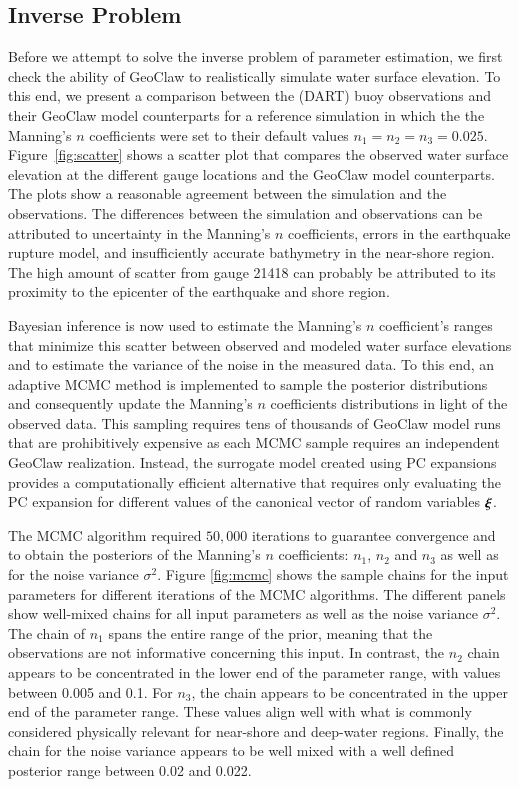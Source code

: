 \documentclass[review,12pt]{elsarticle}
\newcommand{\xxi}{\vec{\xi}}
\renewcommand{\vec}[1]{{\mathchoice
                     {\mbox{\boldmath$\displaystyle{#1}$}}
                     {\mbox{\boldmath$\textstyle{#1}$}}
                     {\mbox{\boldmath$\scriptstyle{#1}$}}
                     {\mbox{\boldmath$\scriptscriptstyle{#1}$}}}}
\newcommand{\geoclaw}{{\sc GeoClaw}\xspace}
\begin{document}
\subsection{Inverse Problem} 
\label{sec:inverse}

Before we attempt to solve the inverse problem of parameter estimation, 
we first check the ability of \geoclaw to realistically simulate water 
surface elevation. To this end, we present a comparison between the 
(DART) buoy observations and their \geoclaw model counterparts
for a reference simulation in which the the Manning's $n$ coefficients were set to their default values $n_1=n_2=n_3=0.025$. Figure~\ref{fig:scatter} 
shows a scatter plot that compares the observed 
water surface elevation at the different gauge locations and the \geoclaw model counterparts. The plots show a reasonable agreement between the simulation and the observations.  The differences between the simulation and observations can be attributed to uncertainty in the Manning's $n$ coefficients, errors in the earthquake rupture model, and insufficiently accurate bathymetry in the near-shore region.  The high amount of scatter from gauge 21418 can probably be attributed to its proximity to the epicenter of the earthquake and shore region.

Bayesian inference is now used to estimate the Manning's 
$n$ coefficient's ranges that minimize this scatter between 
observed and modeled water surface elevations and to estimate the variance of the noise in the measured data.
To this end, an adaptive MCMC method is implemented to sample 
the posterior distributions \citep{Gareth2009,Haario2001} and consequently 
update the Manning's $n$ coefficients distributions in light of the 
observed data. This sampling requires tens of thousands of 
\geoclaw model runs that are prohibitively expensive as each MCMC 
sample requires an independent \geoclaw realization. Instead,
the surrogate model created using PC expansions provides a computationally
efficient alternative that requires only evaluating the PC expansion
for different values of the canonical vector of random variables $\xxi$.

The MCMC algorithm required $50,000$ iterations to guarantee convergence and to
obtain the posteriors of the Manning's $n$ coefficients:  $n_1$, $n_2$ and $n_3$
as well as for the noise variance $\sigma^2$. Figure \ref{fig:mcmc}  shows the sample
chains for the input parameters for different iterations of the MCMC algorithms.
The different panels show well-mixed chains for all input parameters as well as
the noise variance $\sigma^2$. The chain of  $n_{1}$ spans the entire range of the
prior, meaning that the observations are not informative  concerning this input.
In contrast, the $n_{2}$ chain appears to be concentrated in the  lower end of
the parameter range, with values between 0.005 and 0.1. For $n_{3}$, the chain
appears to be concentrated in the  upper end of the parameter range. These values align well with what is
commonly considered physically relevant for near-shore and deep-water regions.
Finally, the chain for the noise variance  appears to be well mixed with a well defined
posterior range between 0.02 and 0.022.  
\end{document}
